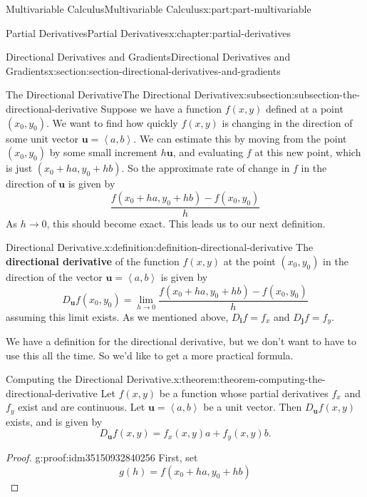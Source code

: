 \documentclass[twoside,10pt,]{book}
\newcommand{\terminology}[1]{\textbf{#1}}
\numberwithin{equation}{part}
\newcommand{\vb}[1]{\mathbf{#1}}
\newcommand{\dotprod}[1]{\left\langle #1 \right\rangle}
\begin{document}
\begin{partptx}{Multivariable Calculus}{}{Multivariable Calculus}{}{}{x:part:part-multivariable}
\begin{chapterptx}{Partial Derivatives}{}{Partial Derivatives}{}{}{x:chapter:partial-derivatives}
\begin{sectionptx}{Directional Derivatives and Gradients}{}{Directional Derivatives and Gradients}{}{}{x:section:section-directional-derivatives-and-gradients}
%
\begin{subsectionptx}{The Directional Derivative}{}{The Directional Derivative}{}{}{x:subsection:subsection-the-directional-derivative}
Suppose we have a function \(f(x,y)\) defined at a point \((x_{0},y_{0})\). We want to find how quickly \(f(x,y)\) is changing in the direction of some unit vector \(\vb{u} = \dotprod{a,b}\). We can estimate this by moving from the point \((x_{0},y_{0})\) by some small increment \(h\vb{u}\), and evaluating \(f\) at this new point, which is just \((x_{0} + ha, y_{0} + hb)\). So the approximate rate of change in \(f\) in the direction of \(\vb{u}\) is given by%
\begin{equation*}
\frac{f(x_{0}+ha, y_{0} + hb) - f(x_{0},y_{0})}{h}
\end{equation*}
As \(h\to0\), this should become exact. This leads us to our next definition.%
\begin{definition}{Directional Derivative.}{x:definition:definition-directional-derivative}%
%
The \terminology{directional derivative} of the function \(f(x,y)\) at the point \((x_{0},y_{0})\) in the direction of the vector \(\vb{u} = \dotprod{a,b}\) is given by%
\begin{equation*}
D_{\vb{u}}f(x_{0},y_{0}) = \lim_{h\to0}\frac{f(x_{0}+ha, y_{0} + hb) - f(x_{0},y_{0})}{h}
\end{equation*}
assuming this limit exists. As we mentioned above, \(D_{\vb{i}}f = f_{x}\) and \(D_{\vb{j}}f = f_{y}\).%
\end{definition}
We have a definition for the directional derivative, but we don't want to have to use this all the time. So we'd like to get a more practical formula.%
\begin{theorem}{Computing the Directional Derivative.}{}{x:theorem:theorem-computing-the-directional-derivative}%
%
Let \(f(x,y)\) be a function whose partial derivatives \(f_{x}\) and \(f_{y}\) exist and are continuous. Let \(\vb{u} = \dotprod{a,b}\) be a unit vector. Then \(D_{\vb{u}}f(x,y)\) exists, and is given by%
\begin{equation*}
D_{\vb{u}}f(x,y) = f_{x}(x,y)a + f_{y}(x,y)b.
\end{equation*}
%
\end{theorem}
\begin{proof}{}{g:proof:idm35150932840256}
First, set%
\begin{equation*}
g(h) = f(x_{0}+ha, y_{0} +hb)
\end{equation*}

\end{proof}
\end{subsectionptx}
\end{sectionptx}
\end{chapterptx}
\end{partptx}
\end{document}
